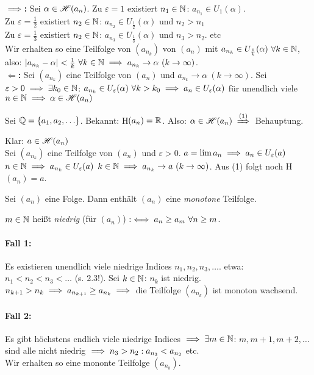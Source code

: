 \documentclass[a4paper,twoside,DIV15,BCOR12mm]{scrbook}
\begin{document}
\begin{beweise}
\item \textbf{\glqq$\implies$\grqq:} Sei $\alpha\in \mathscr{H}(a_n)$. Zu $\varepsilon = 1$ existiert $n_1\in\mathbb{N}$: $a_{n_1}\in U_1(\alpha)$. \\
Zu $\varepsilon =\frac{1}{2}$ existiert $n_2\in\mathbb{N}$: $a_{n_2} \in U_{\frac{1}{2}}(\alpha)$ und $n_2>n_1$ \\
Zu $\varepsilon =\frac{1}{3}$ existiert $n_2\in\mathbb{N}$: $a_{n_3} \in U_{\frac{1}{3}}(\alpha)$ und $n_3>n_2$. etc \\
Wir erhalten so eine Teilfolge von $(a_{n_k})$ von $(a_n)$ mit $a_{n_k} \in U_{\frac{1}{k}}(\alpha) \ \forall k\in\MdN$, also: $|a_{n_k} - \alpha| < \frac{1}{k} \ \forall k\in\MdN \folgt a_{n_k} \to \alpha \ (k\to\infty)$. \\
\textbf{\glqq$\Leftarrow$\grqq:} Sei $(a_{n_k})$ eine Teilfolge von $(a_n)$ und  $a_{n_k} \to \alpha\ (k\to\infty)$. Sei $\varepsilon > 0 \implies \exists k_0 \in\mathbb{N}$: $a_{n_k} \in U_\varepsilon(\alpha) \ \forall k>k_0 \implies a_n \in U_\varepsilon(\alpha)$ für unendlich viele $n\in\mathbb{N} \implies \alpha \in \mathscr{H}(a_n)$
\item Sei $\mathbb{Q} = \{a_1, a_2, \ldots\}$. Bekannt: H$(a_n) = \mathbb{R}$. Also: $\alpha \in \H(a_n) \folgtnach{(1)}$ Behauptung.
\item Klar: $a \in \mathscr{H}(a_n)$\\
Sei $(a_{n_k})$ eine Teilfolge von $(a_n)$ und $\varepsilon > 0 $. $a = \lim a_n \implies a_n \in U_\varepsilon(a)$ \ffa $n\in\mathbb{N} \implies a_{n_k} \in U_\varepsilon(a)$ \ffa $k\in\mathbb{N} \implies a_{n_k} \to a\ (k\to\infty)$. Aus (1) folgt noch H$(a_n) = {a}$.
\end{beweise}


\begin{hilfssatz}
Sei $(a_n)$ eine Folge. Dann enthält $(a_n)$ eine \textit{monotone} Teilfolge.
\end{hilfssatz}

\begin{beweis}
$m\in\mathbb{N}$ heißt \textit{niedrig} (für $(a_n)$) $:\iff a_n \ge a_m \ \forall n\ge m$.
\paragraph{Fall 1:} Es existieren unendlich viele niedrige Indices $n_1,n_2,n_3,\ldots$. etwa: $n_1 < n_2 < n_3 < \ldots$ (s. 2.3!). Sei $k\in\mathbb{N}$: $n_k$ ist niedrig. $n_{k+1} > n_k \implies a_{n_{k+1}} \ge a_{n_k} \implies$ die Teilfolge $(a_{n_k})$ ist monoton wachsend.
\paragraph{Fall 2:} Es gibt höchstens endlich viele niedrige Indices $\implies \exists m\in\mathbb{N}$: $m, m+1, m+2,\ldots$ sind alle nicht niedrig $\implies n_3>n_2: a_{n_3} < a_{n_2}$ etc. \\
Wir erhalten so eine mononte Teilfolge $(a_{n_k})$.
\end{beweis}
\end{document}
